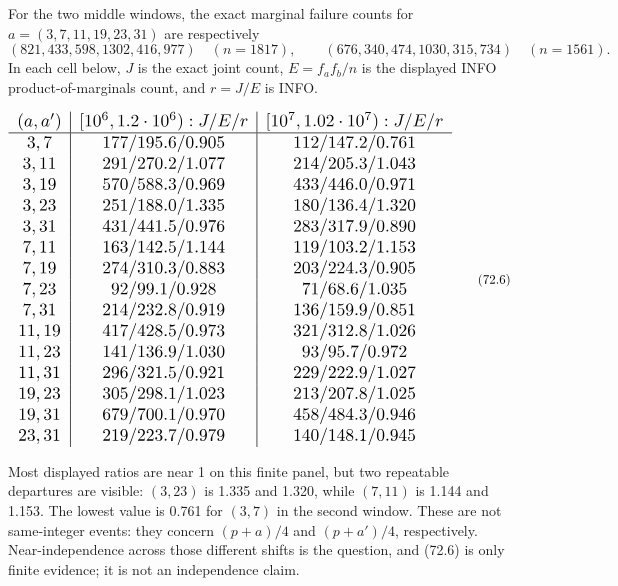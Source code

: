 \documentclass[10pt,reqno]{amsart}
\theoremstyle{definition}
\newcommand{\1}{\mathbf 1}
\begin{document}
For the two middle windows, the exact marginal failure counts for
$a=(3,7,11,19,23,31)$ are respectively
\begin{equation}
 (821,433,598,1302,416,977)\quad(n=1817),\qquad
 (676,340,474,1030,315,734)\quad(n=1561).                  \tag{72.5}
\end{equation}
In each cell below, $J$ is the exact joint count,
$E=f_af_b/n$ is the displayed INFO product-of-marginals count, and
$r=J/E$ is INFO.

\begin{equation}
\resizebox{\textwidth}{!}{$
\begin{array}{c|c|c}
(a,a')&[10^6,1.2\cdot10^6):J/E/r&[10^7,1.02\cdot10^7):J/E/r\\ \hline
3,7&177/195.6/0.905&112/147.2/0.761\\
3,11&291/270.2/1.077&214/205.3/1.043\\
3,19&570/588.3/0.969&433/446.0/0.971\\
3,23&251/188.0/1.335&180/136.4/1.320\\
3,31&431/441.5/0.976&283/317.9/0.890\\
7,11&163/142.5/1.144&119/103.2/1.153\\
7,19&274/310.3/0.883&203/224.3/0.905\\
7,23&92/99.1/0.928&71/68.6/1.035\\
7,31&214/232.8/0.919&136/159.9/0.851\\
11,19&417/428.5/0.973&321/312.8/1.026\\
11,23&141/136.9/1.030&93/95.7/0.972\\
11,31&296/321.5/0.921&229/222.9/1.027\\
19,23&305/298.1/1.023&213/207.8/1.025\\
19,31&679/700.1/0.970&458/484.3/0.946\\
23,31&219/223.7/0.979&140/148.1/0.945
\end{array}
$}                                                          \tag{72.6}
\end{equation}

Most displayed ratios are near 1 on this finite panel, but two repeatable
departures are visible: $(3,23)$ is 1.335 and 1.320, while $(7,11)$ is
1.144 and 1.153.  The lowest value is 0.761 for $(3,7)$ in the second
window.  These are not same-integer events: they concern
$(p+a)/4$ and $(p+a')/4$, respectively.  Near-independence across those
different shifts is the question, and (72.6) is only finite evidence; it is
not an independence claim.
\end{document}
